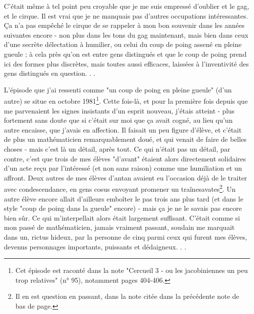 C'était même à tel point peu croyable que je me suis empressé d'oublier et le gag, et le cirque. Il est vrai que je ne manquais pas d'autres occupations intéressantes. Ça n'a pas empêché le cirque de se rappeler à mon bon souvenir dans les années suivantes encore - non plus dans les tons du gag maintenant, mais bien dans ceux d'une secrète délectation à humilier, ou celui du coup de poing assené en pleine gueule ; à cela près qu'on est entre gens distingués et que le coup de poing prend ici des formes plus discrètes, mais toutes aussi efficaces, laissées à l'inventivité des gens distingués en question. . .

L'épisode que j'ai ressenti comme "un coup de poing en pleine gueule" (d'un autre) se situe en octobre 1981\footnote{Cet épisode est raconté dans la note "Cercueil 3 - ou les jacobiniennes un peu trop relatives" (n° 95), notamment pages 404-406.}. Cette fois-là, et pour la première fois depuis que me parvenaient les signes insistants d'un esprit nouveau, j'étais atteint - plus fortement sans doute que si c'était sur moi que ça avait cogné, au lieu qu'un autre encaisse, que j'avais en affection. Il faisait un peu figure d'élève, et c'était de plus un mathématicien remarquablement doué, et qui venait de faire de belles choses - mais c'est là un détail, après tout. Ce qui n'était pas un détail, par contre, c'est que trois de mes élèves "d'avant" étaient alors directement solidaires d'un acte reçu par l'intéressé (et non sans raison) comme une humiliation et un affront. Deux autres de mes élèves d'antan avaient eu l'occasion déjà de le traiter avec condescendance, en gens cosus envoyant promener un traînesavates\footnote{Il en est question en passant, dans la note citée dans la précédente note de bas de page.}. Un autre élève encore allait d'ailleurs emboîter le pas trois ans plus tard (et dans le style "coup de poing dans la gueule" encore) - mais ça je ne le savais pas encore bien sûr. Ce qui m'interpellait alors était largement suffisant. C'était comme si mon passé de mathématicien, jamais vraiment passant, soudain me marquait dans un, rictus hideux, par la personne de cinq parmi ceux qui furent mes élèves, devenus personnages importants, puissants et dédaigneux. . .

